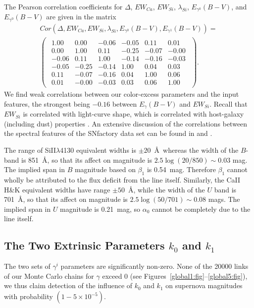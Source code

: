 \documentclass{aastex61}   	%
\begin{document}
The Pearson correlation coefficients for $\Delta$, $EW_{Ca}$, $EW_{Si}$, $\lambda_{Si}$, $E_{\gamma^0}(B-V)$, and $E_{\gamma^0}(B-V)$ are given in the matrix
\begin{multline}
Cor(\Delta, EW_{Ca}, EW_{Si}, \lambda_{Si}, E_{\gamma^0}(B-V), E_{\gamma^1}(B-V)) =\\
\begin{pmatrix}
\begin{array}{rrrrrr}
1.00 & 0.00 & -0.06 & -0.05 & 0.11 & 0.01 \\
0.00 & 1.00 & 0.11 & -0.25 & -0.07 & -0.00 \\
-0.06 & 0.11 & 1.00 & -0.14 & -0.16 & -0.03 \\
-0.05 & -0.25 & -0.14 & 1.00 & 0.04 & 0.03 \\
0.11 & -0.07 & -0.16 & 0.04 & 1.00 & 0.06 \\
0.01 & -0.00 & -0.03 & 0.03 & 0.06 & 1.00
\end{array}
\end{pmatrix}.
\end{multline}
We find weak correlations between our color-excess parameters and the input features, the strongest being $-0.16$ between
$E_\gamma(B-V)$ and $EW_{Si}$.
Recall that $EW_{Si}$ is correlated with light-curve shape, which is correlated with host-galaxy (including dust) properties 
\citep{2000AJ....120.1479H, 2003MNRAS.340.1057S}.
An extensive discussion of the correlations between the spectral features of the SNfactory data set can be found in \citet{chotard:thesis}
and \citet{leget:thesis}.

The range of SiII$\lambda$4130 equivalent widths is $\pm 20$~\AA\ whereas the width of the $B$-band is 851~\AA, so that its affect on magnitude
is
$2.5 \log{(20/850)} \sim 0.03$ mag.  
The implied span in $B$ magnitude based on $\beta_1$ is 0.54~mag.  Therefore $\beta_1$ cannot wholly be attributed to the flux deficit
from the line itself.
Similarly, the CaII H\&K equivalent widths have range $\pm 50$~\AA, while the width of the $U$ band is
701~\AA, so that its affect on magnitude
is
$2.5 \log{(50/701)} \sim 0.08$ mags.   The implied span in $U$ magnitude is  0.21~mag, so $\alpha_0$ cannot be completely due to the line itself.

\subsection{The Two Extrinsic Parameters $k_0$ and $k_1$}
The two sets of  $\gamma^i$ parameters  are significantly non-zero. 
None of the 20000 links of 
our Monte Carlo chains for $\gamma$ exceed 0 (see Figures~\ref{global1:fig}--\ref{global5:fig}), we thus claim detection of the
influence of $k_0$ and $k_1$  on supernova magnitudes
with probability $(1-5\times 10^{-5})$.
\end{document}
